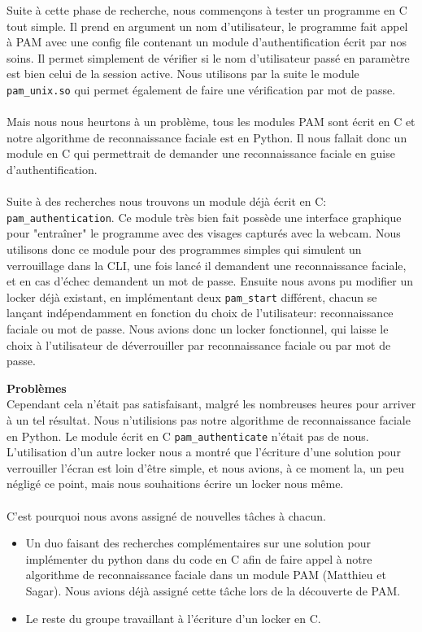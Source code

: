\documentclass[french]{report}
\begin{document}
  Suite à cette phase de recherche, nous commençons à tester un programme en C
  tout simple. Il prend en argument un nom d’utilisateur, le programme fait
  appel à PAM avec une config file contenant un module d’authentification écrit
  par nos soins. Il permet simplement de vérifier si le nom d’utilisateur passé
  en paramètre est bien celui de la session active. Nous utilisons par la suite
  le module \texttt{pam\_unix.so} qui permet également de faire une
  vérification par mot de passe.
\\ \\
  Mais nous nous heurtons à un problème, tous les modules PAM sont écrit en C
  et notre algorithme de reconnaissance faciale est en Python. Il nous fallait
  donc un module en C qui permettrait de demander une reconnaissance faciale en
  guise d’authentification.
\\ \\
  Suite à des recherches nous trouvons un module déjà écrit en C:
\texttt{pam\_authentication}. Ce module très bien fait possède une interface
graphique pour "entraîner" le programme avec des visages capturés avec la
webcam. Nous utilisons donc ce module pour des programmes simples qui simulent un
verrouillage dans la CLI,  une fois lancé il demandent une reconnaissance faciale,
et en cas d’échec demandent un mot de passe. Ensuite nous avons pu modifier un
locker déjà existant, en implémentant deux \texttt{pam\_start} différent,
chacun se lançant indépendamment en fonction du choix de l’utilisateur:
reconnaissance faciale ou mot de passe. Nous avions donc un locker fonctionnel,
qui laisse le choix à l’utilisateur de déverrouiller par reconnaissance faciale
ou par mot de passe.

\vspace{0.5cm}

  \textbf{Problèmes}\\

  Cependant cela n’était pas satisfaisant, malgré les nombreuses heures pour
  arriver à un tel résultat. Nous n’utilisions pas notre algorithme de
  reconnaissance faciale en Python. Le module écrit en C
  \texttt{pam\_authenticate} n’était pas de nous. L’utilisation d’un autre
  locker nous a montré que l’écriture d’une solution pour verrouiller l’écran
  est loin d’être simple, et nous avions, à ce moment la, un peu négligé ce
  point, mais nous souhaitions écrire un locker nous même.
\\ \\
  C’est pourquoi nous avons assigné de nouvelles tâches à chacun.
  \begin{itemize}[label=\textbullet, font=\normalfont \color{blue}]
    \item{Un duo faisant des recherches complémentaires sur une
  solution pour implémenter du python dans du code en C afin de faire appel à
  notre algorithme de reconnaissance faciale dans un module PAM (Matthieu et
  Sagar). Nous avions déjà assigné cette tâche lors de la découverte de PAM.}
    \item{Le reste du groupe travaillant à l’écriture d’un locker en C.}
  \end{itemize}
\end{document}
